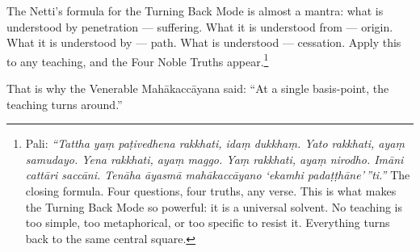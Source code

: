 The Netti's formula for the Turning Back Mode is almost a mantra: what is understood by penetration --- suffering. What it is understood from --- origin. What it is understood by --- path. What is understood --- cessation. Apply this to any teaching, and the Four Noble Truths appear.\footnote{Pali: \textit{``Tattha yaṃ paṭivedhena rakkhati, idaṃ dukkhaṃ. Yato rakkhati, ayaṃ samudayo. Yena rakkhati, ayaṃ maggo. Yaṃ rakkhati, ayaṃ nirodho. Imāni cattāri saccāni. Tenāha āyasmā mahākaccāyano `ekamhi padaṭṭhāne'\,''ti.''} The closing formula. Four questions, four truths, any verse. This is what makes the Turning Back Mode so powerful: it is a universal solvent. No teaching is too simple, too metaphorical, or too specific to resist it. Everything turns back to the same central square.}

That is why the Venerable Mahākaccāyana said: ``At a single basis-point, the teaching turns around.''
